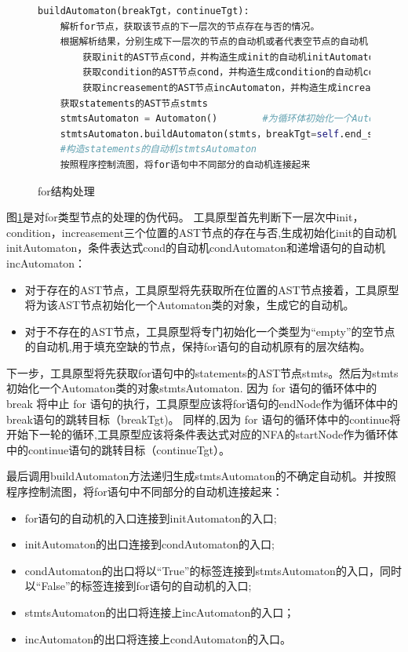\begin{figure}[ht]
\centering
\begin{minipage}{16cm}
\begin{lstlisting}[language=Python]
buildAutomaton(breakTgt，continueTgt): 
    解析for节点，获取该节点的下一层次的节点存在与否的情况。
    根据解析结果，分别生成下一层次的节点的自动机或者代表空节点的自动机：
        获取init的AST节点cond，并构造生成init的自动机initAutomaton
        获取condition的AST节点cond，并构造生成condition的自动机condAutomaton
        获取increasement的AST节点incAutomaton，并构造生成increasement的自动机incAutomaton
    获取statements的AST节点stmts
    stmtsAutomaton = Automaton()        #为循环体初始化一个Automaton类的对象
    stmtsAutomaton.buildAutomaton(stmts，breakTgt=self.end_state，continueTgt=condAutomaton.start_state)     
    #构造statements的自动机stmtsAutomaton
    按照程序控制流图，将for语句中不同部分的自动机连接起来
\end{lstlisting}
    \caption{for结构处理}
    \label{for结构处理}
\end{minipage}
\end{figure}


图\ref{for结构处理}是对for类型节点的处理的伪代码。
工具原型首先判断下一层次中init，condition，increasement三个位置的AST节点的存在与否,生成初始化init的自动机initAutomaton，条件表达式cond的自动机condAutomaton和递增语句的自动机incAutomaton：
\begin{itemize}
    \item 对于存在的AST节点，工具原型将先获取所在位置的AST节点接着，工具原型将为该AST节点初始化一个Automaton类的对象，生成它的自动机。
    \item 对于不存在的AST节点，工具原型将专门初始化一个类型为“empty”的空节点的自动机,用于填充空缺的节点，保持for语句的自动机原有的层次结构。
\end{itemize}

下一步，工具原型将先获取for语句中的statements的AST节点stmts。然后为stmts初始化一个Automaton类的对象stmtsAutomaton.
因为 for 语句的循环体中的 break 将中止 for 语句的执行，工具原型应该将for语句的endNode作为循环体中的break语句的跳转目标（breakTgt)。
同样的,因为 for 语句的循环体中的continue将开始下一轮的循环,工具原型应该将条件表达式对应的NFA的startNode作为循环体中的continue语句的跳转目标（continueTgt）。



最后调用buildAutomaton方法递归生成stmtsAutomaton的不确定自动机。并按照程序控制流图，将for语句中不同部分的自动机连接起来：
\begin{itemize}
    \item for语句的自动机的入口连接到initAutomaton的入口;
    \item initAutomaton的出口连接到condAutomaton的入口;
    \item condAutomaton的出口将以“True”的标签连接到stmtsAutomaton的入口，同时以“False”的标签连接到for语句的自动机的入口;
    \item stmtsAutomaton的出口将连接上incAutomaton的入口；
    \item incAutomaton的出口将连接上condAutomaton的入口。
\end{itemize}



